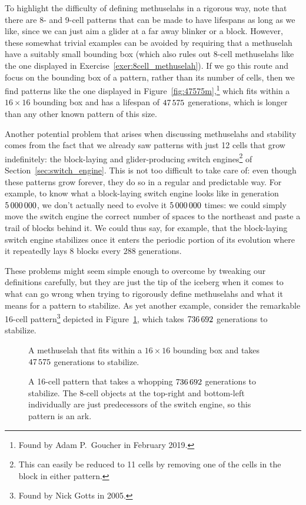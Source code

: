 To highlight the difficulty of defining methuselahs in a rigorous way, note that there are 8- and 9-cell patterns that can be made to have lifespans as long as we like, since we can just aim a glider at a far away blinker or a block. However, these somewhat trivial examples can be avoided by requiring that a methuselah have a suitably small bounding box (which also rules out $8$-cell methuselahs like the one displayed in Exercise~\ref{exer:8cell_methuselah}). If we go this route and focus on the bounding box of a pattern, rather than its number of cells, then we find patterns like the one displayed in Figure~\ref{fig:47575m},\footnote{Found by Adam P.~Goucher in February 2019.} which fits within a $16 \times 16$ bounding box and has a lifespan of $47{\,}575$ generations, which is longer than any other known pattern of this size.

Another potential problem that arises when discussing methuselahs and stability comes from the fact that we already saw patterns with just 12 cells that grow indefinitely: the block-laying and glider-producing switch engines\footnote{This can easily be reduced to 11 cells by removing one of the cells in the block in either pattern.} of Section~\ref{sec:switch_engine}. This is not too difficult to take care of: even though these patterns grow forever, they do so in a regular and predictable way. For example, to know what a block-laying switch engine looks like in generation $5{\,}000{\,}000$, we don't actually need to evolve it $5{\,}000{\,}000$ times: we could simply move the switch engine the correct number of spaces to the northeast and paste a trail of blocks behind it. We could thus say, for example, that the block-laying switch engine stabilizes once it enters the periodic portion of its evolution where it repeatedly lays $8$ blocks every $288$ generations.

These problems might seem simple enough to overcome by tweaking our definitions carefully, but they are just the tip of the iceberg when it comes to what can go wrong when trying to rigorously define methuselahs and what it means for a pattern to stabilize. As yet another example, consider the remarkable 16-cell pattern\footnote{Found by Nick Gotts in 2005.} depicted in Figure~\ref{fig:ark_736692}, which takes $736{\,}692$ generations to stabilize.

\begin{figure}[!htb]
	\centering
	\begin{minipage}[b]{0.4\textwidth}
		\centering{}
		\caption{A methuselah that fits within a $16 \times 16$ bounding box and takes $47{\,}575$ generations to stabilize.}\label{fig:47575m}
	\end{minipage}\hfill
	\begin{minipage}[b]{0.56\textwidth}
		\centering{}
		\caption{A 16-cell pattern that takes a whopping $736{\,}692$ generations to stabilize. The $8$-cell objects at the top-right and bottom-left individually are just predecessors of the switch engine, so this pattern is an ark.}\label{fig:ark_736692}
	\end{minipage}
\end{figure}

